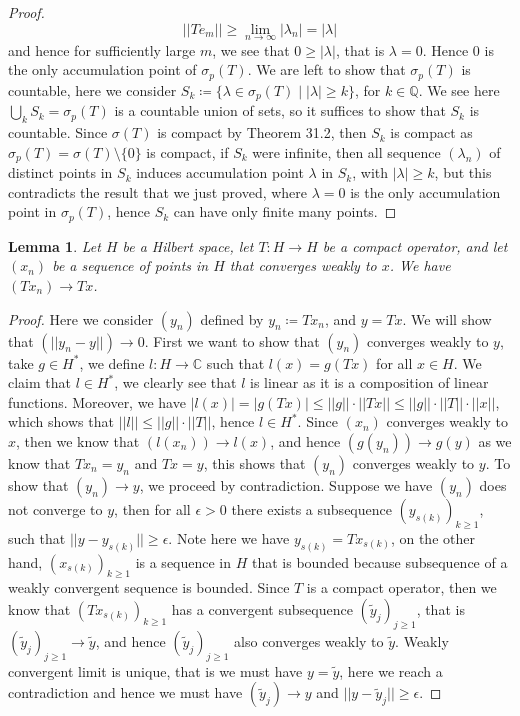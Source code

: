 \documentclass[11pt]{book}
\theoremstyle{break}
\theoremstyle{break}
\newtheorem{lem}{Lemma}[thm]
\newcommand{\Q}{\mathbb{Q}}
\newcommand{\C}{\mathbb{C}}
\newcommand{\that}[1]{\widetilde{#1}}
\begin{document}
\begin{proof}
$$||T e_m|| \geq\lim_{n\to \infty}|\lambda_n | = |\lambda|$$
and hence for sufficiently large $m$, we see that $ 0 \geq |\lambda|$, that is $\lambda = 0$. Hence $0$ is the only accumulation point of $\sigma_p(T)$. We are left to show that $\sigma_p(T)$ is countable, here we consider $S_k \coloneqq \{ \lambda \in \sigma_p(T) \mid |\lambda| \geq k\}$, for $k \in \Q$. We see here $\bigcup_k S_k = \sigma_p(T)$ is a countable union of sets, so it suffices to show that $S_k$ is countable.  Since $\sigma(T)$ is compact by Theorem 31.2, then $S_k $ is compact as $\sigma_p(T) = \sigma(T) \setminus \{0\}$ is compact, if $S_k$ were infinite, then all sequence $(\lambda_n)$ of distinct points in $S_k$ induces accumulation point $\lambda$ in $S_k$, with $|\lambda| \geq k$, but this contradicts the result that we just proved, where $\lambda=0$ is the only accumulation point in $\sigma_p(T)$, hence $S_k$ can have only finite many points. 
\end{proof}

\begin{lem}
Let $H$ be a Hilbert space, let $T:H \to H$ be a compact operator, and let $(x_n)$ be a sequence of points in $H$ that converges weakly to $x$. We have $(Tx_n) \to Tx$.
\end{lem}
\begin{proof}
Here we consider $(y_n)$ defined by $y_n \coloneqq Tx_n$, and $y = Tx$. We will show that $(||y_n - y||) \to 0$. First we want to show that $(y_n)$ converges weakly to $y$, take $g \in H^*$, we define $l:H \to \C$ such that $l(x) = g(Tx)$ for all $x\in H$. We claim that $l \in H^*$, we clearly see that $l$ is linear as it is a composition of linear functions. Moreover, we have $|l(x)| = |g(Tx)| \leq ||g|| \cdot ||Tx|| \leq ||g||\cdot ||T|| \cdot ||x||$, which shows that $||l|| \leq ||g||\cdot ||T||$, hence $l \in H^*$. Since $(x_n)$ converges weakly to $x$, then we know that $(l(x_n))\to l(x)$, and hence $(g(y_n)) \to g(y)$ as we know that $Tx_n = y_n$ and $Tx = y$, this shows that $(y_n)$ converges weakly to $y$. To show that $(y_n)\to y$, we proceed by contradiction. Suppose we have $(y_n)$ does not converge to $y$, then for all $\epsilon>0$ there exists a subsequence $(y_{s(k)})_{k \geq 1}$, such that $||y - y_{s(k)}||\geq \epsilon$. Note here we have $y_{s(k)} = Tx_{s(k)}$, on the other hand, $(x_{s(k)})_{k\geq 1}$ is a sequence in $H$ that is bounded because subsequence of a weakly convergent sequence is bounded. Since $T$ is a compact operator, then we know that $(Tx_{s(k)})_{k\geq 1}$ has a convergent subsequence $(\that{y}_j)_{j \geq 1}$, that is $(\that{y}_j)_{j \geq 1} \to \that{y}$, and hence $(\that{y}_j)_{j\geq 1}$ also converges weakly to $\that{y}$. Weakly convergent limit is unique, that is we must have $y = \that{y}$, here we reach a contradiction and hence we must have $(\that{y}_j) \to y$ and $||y - \that{y}_j || \geq \epsilon$. 
\end{proof}
\end{document}

